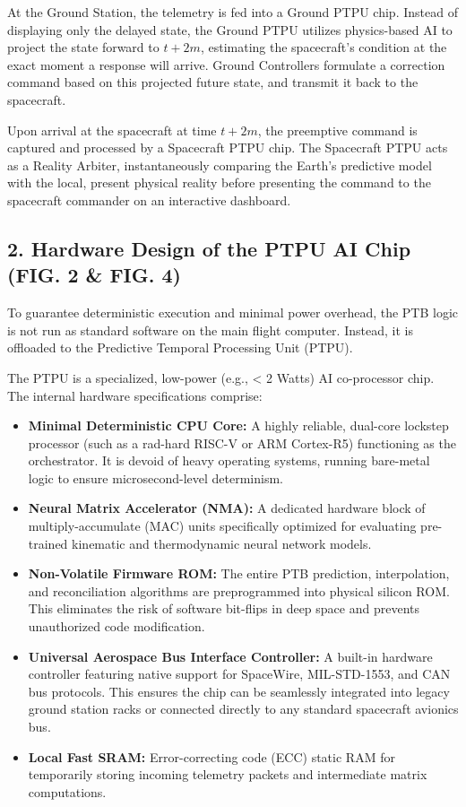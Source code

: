 \documentclass[12pt,a4paper]{article}
\begin{document}
At the Ground Station, the telemetry is fed into a Ground PTPU chip. Instead of displaying only the delayed state, the Ground PTPU utilizes physics-based AI to project the state forward to $t+2m$, estimating the spacecraft's condition at the exact moment a response will arrive. Ground Controllers formulate a correction command based on this projected future state, and transmit it back to the spacecraft.

Upon arrival at the spacecraft at time $t+2m$, the preemptive command is captured and processed by a Spacecraft PTPU chip. The Spacecraft PTPU acts as a Reality Arbiter, instantaneously comparing the Earth's predictive model with the local, present physical reality before presenting the command to the spacecraft commander on an interactive dashboard. 

\subsection*{2. Hardware Design of the PTPU AI Chip (FIG. 2 \& FIG. 4)}
To guarantee deterministic execution and minimal power overhead, the PTB logic is not run as standard software on the main flight computer. Instead, it is offloaded to the Predictive Temporal Processing Unit (PTPU).

The PTPU is a specialized, low-power (e.g., < 2 Watts) AI co-processor chip. The internal hardware specifications comprise:
\begin{itemize}
    \item \textbf{Minimal Deterministic CPU Core:} A highly reliable, dual-core lockstep processor (such as a rad-hard RISC-V or ARM Cortex-R5) functioning as the orchestrator. It is devoid of heavy operating systems, running bare-metal logic to ensure microsecond-level determinism.
    \item \textbf{Neural Matrix Accelerator (NMA):} A dedicated hardware block of multiply-accumulate (MAC) units specifically optimized for evaluating pre-trained kinematic and thermodynamic neural network models.
    \item \textbf{Non-Volatile Firmware ROM:} The entire PTB prediction, interpolation, and reconciliation algorithms are preprogrammed into physical silicon ROM. This eliminates the risk of software bit-flips in deep space and prevents unauthorized code modification.
    \item \textbf{Universal Aerospace Bus Interface Controller:} A built-in hardware controller featuring native support for SpaceWire, MIL-STD-1553, and CAN bus protocols. This ensures the chip can be seamlessly integrated into legacy ground station racks or connected directly to any standard spacecraft avionics bus.
    \item \textbf{Local Fast SRAM:} Error-correcting code (ECC) static RAM for temporarily storing incoming telemetry packets and intermediate matrix computations.
\end{itemize}
\end{document}
